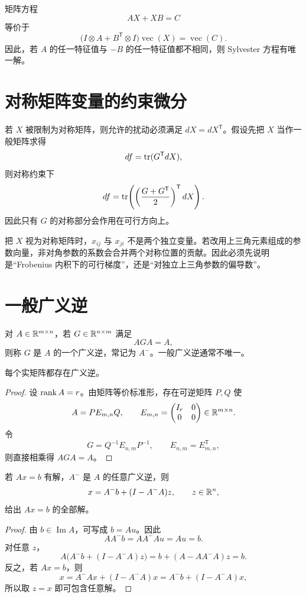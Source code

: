 \begin{corollary}
矩阵方程
\[
AX+XB=C
\]
等价于
\[
\bigl(I\otimes A+B^{\mathsf T}\otimes I\bigr)
\operatorname{vec}(X)=\operatorname{vec}(C).
\]
因此，若 $A$ 的任一特征值与 $-B$ 的任一特征值都不相同，则 Sylvester 方程有唯一解。
\end{corollary}

\section{对称矩阵变量的约束微分}

若 $X$ 被限制为对称矩阵，则允许的扰动必须满足 $dX=dX^{\mathsf T}$。假设先把 $X$ 当作一般矩阵求得
\[
df=\operatorname{tr}(G^{\mathsf T}dX),
\]
则对称约束下
\[
df=\operatorname{tr}\!\left(\left(\frac{G+G^{\mathsf T}}2\right)^{\mathsf T}dX\right).
\]
因此只有 $G$ 的对称部分会作用在可行方向上。

\begin{pitfall}[对称约束与独立参数求导不是同一种记号]
把 $X$ 视为对称矩阵时，$x_{ij}$ 与 $x_{ji}$ 不是两个独立变量。若改用上三角元素组成的参数向量，非对角参数的系数会合并两个对称位置的贡献。因此必须先说明是“Frobenius 内积下的可行梯度”，还是“对独立上三角参数的偏导数”。
\end{pitfall}

\section{一般广义逆}

\begin{definition}[一般广义逆]
对 $A\in\mathbb{R}^{m\times n}$，若 $G\in\mathbb{R}^{n\times m}$ 满足
\[
AGA=A,
\]
则称 $G$ 是 $A$ 的一个广义逆，常记为 $A^{-}$。一般广义逆通常不唯一。
\end{definition}

\begin{theorem}[广义逆的存在性]
每个实矩阵都存在广义逆。
\end{theorem}
\begin{proof}
设 $\operatorname{rank} A=r$。由矩阵等价标准形，存在可逆矩阵 $P,Q$ 使
\[
A=PE_{m,n}Q,
\qquad
E_{m,n}=\begin{pmatrix}I_r&0\\0&0\end{pmatrix}\in\mathbb{R}^{m\times n}.
\]
令
\[
G=Q^{-1}E_{n,m}P^{-1},
\qquad E_{n,m}=E_{m,n}^{\mathsf T},
\]
则直接相乘得 $AGA=A$。
\end{proof}

\begin{theorem}[相容线性方程的通解]
若 $Ax=b$ 有解，$A^{-}$ 是 $A$ 的任意广义逆，则
\[
x=A^{-}b+(I-A^{-}A)z,
\qquad z\in\mathbb{R}^n,
\]
给出 $Ax=b$ 的全部解。
\end{theorem}
\begin{proof}
由 $b\in\operatorname{Im}A$，可写成 $b=Au$。因此
\[
AA^{-}b=AA^{-}Au=Au=b.
\]
对任意 $z$，
\[
A\bigl(A^{-}b+(I-A^{-}A)z\bigr)
=b+(A-AA^{-}A)z=b.
\]
反之，若 $Ax=b$，则
\[
x=A^{-}Ax+(I-A^{-}A)x
=A^{-}b+(I-A^{-}A)x,
\]
所以取 $z=x$ 即可包含任意解。
\end{proof}

